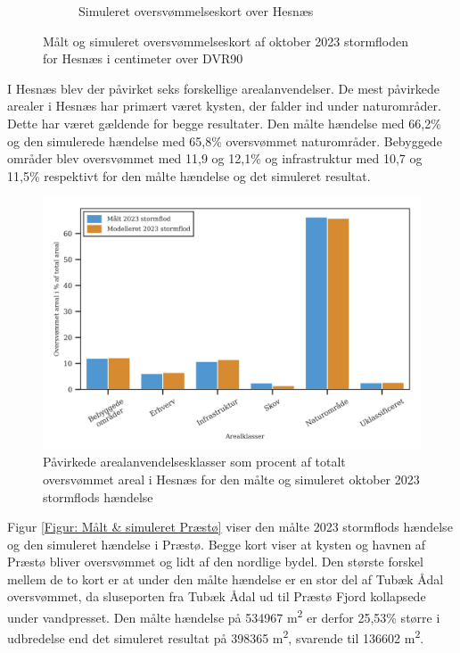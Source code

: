 \begin{figure}[H]
\begin{subfigure}[t]{0.5\textwidth}
        \caption{Simuleret oversvømmelseskort over Hesnæs}
        \label{Subfig: Model Hesnæs}
    \end{subfigure}
    \caption{Målt og simuleret oversvømmelseskort af oktober 2023 stormfloden for Hesnæs i centimeter over DVR90}
    \label{Figur: Målt & simuleret Hesnæs}
\end{figure}

I Hesnæs blev der påvirket seks forskellige arealanvendelser. De mest påvirkede arealer i Hesnæs har primært været kysten, der falder ind under naturområder. Dette har været gældende for begge resultater. Den målte hændelse med 66,2\% og den simulerede hændelse med 65,8\% oversvømmet naturområder. Bebyggede områder blev oversvømmet med 11,9 og 12,1\% og infrastruktur med 10,7 og 11,5\% respektivt for den målte hændelse og det simuleret resultat.  

\begin{figure}[H]
    \centering
    \includegraphics[width=0.8\linewidth]{images/Resultater/areal_anvendelses_grafer/hesnaes_arealanvendelse.jpg}
    \caption{Påvirkede arealanvendelsesklasser som procent af totalt oversvømmet areal i Hesnæs for den målte og simuleret oktober 2023 stormflods hændelse}
    \label{Figur: Påvirket arealanvendelse Hesnæs}
\end{figure}

Figur \ref{Figur: Målt & simuleret Præstø} viser den målte 2023 stormflods hændelse og den simuleret hændelse i Præstø. Begge kort viser at kysten og havnen af Præstø bliver oversvømmet og lidt af den nordlige bydel. Den største forskel mellem de to kort er at under den målte hændelse er en stor del af Tubæk Ådal oversvømmet, da sluseporten fra Tubæk Ådal ud til Præstø Fjord kollapsede under vandpresset. Den målte hændelse på 534967 m\textsuperscript{2} er derfor 25,53\% større i udbredelse end det simuleret resultat på 398365 m\textsuperscript{2}, svarende til 136602 m\textsuperscript{2}. 

